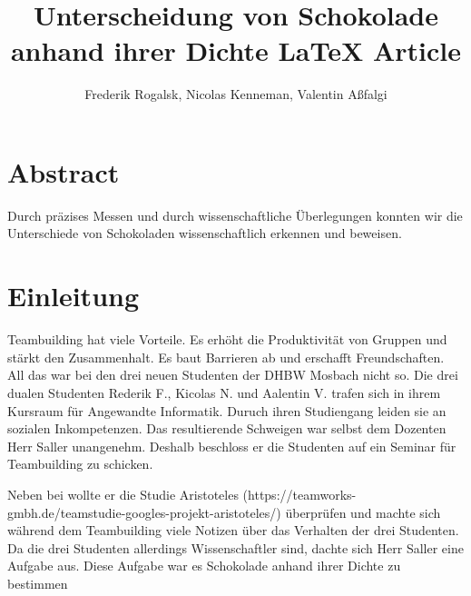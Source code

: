 \documentclass[12pt]{scrartcl}
\title{Unterscheidung von Schokolade anhand ihrer Dichte \LaTeX{} Article}
\author{Frederik Rogalsk, Nicolas Kenneman, Valentin Aßfalgi}
\begin{document}
\maketitle

\section{Abstract}
Durch präzises Messen und durch wissenschaftliche Überlegungen konnten wir die Unterschiede von Schokoladen wissenschaftlich erkennen und beweisen.
\section{Einleitung}
Teambuilding hat viele Vorteile. Es erhöht die Produktivität von Gruppen und stärkt den Zusammenhalt. Es baut Barrieren ab und erschafft Freundschaften. All das war bei den drei neuen Studenten der DHBW Mosbach nicht so. Die drei dualen Studenten Rederik F., Kicolas N. und Aalentin V. trafen sich in ihrem Kursraum für Angewandte Informatik. Duruch ihren Studiengang leiden sie an sozialen Inkompetenzen. Das resultierende Schweigen war selbst dem Dozenten Herr Saller unangenehm. Deshalb beschloss er die Studenten auf ein Seminar für Teambuilding zu schicken. 

Neben bei wollte er die Studie Aristoteles (https://teamworks-gmbh.de/teamstudie-googles-projekt-aristoteles/) überprüfen und machte sich während dem Teambuilding viele Notizen über das Verhalten der drei Studenten. Da die drei Studenten allerdings Wissenschaftler sind, dachte sich Herr Saller eine Aufgabe aus. Diese Aufgabe war es Schokolade anhand ihrer Dichte zu bestimmen
\end{document}
